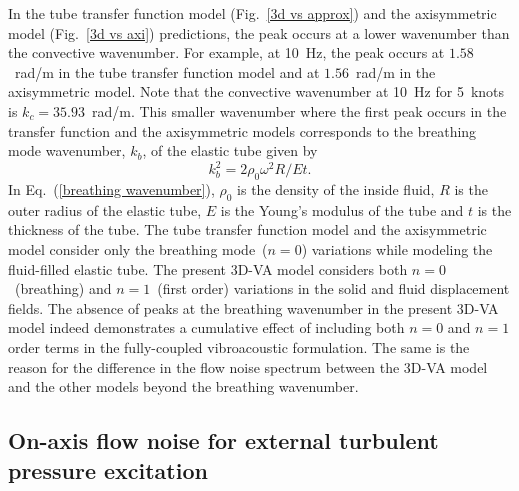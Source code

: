 \documentclass[11pt,cleanfoot]{asme2ej}
\begin{document}
In the tube transfer function model (Fig.~\ref{3d vs approx}) and the axisymmetric model (Fig.~\ref{3d vs axi}) predictions, the peak occurs at a lower wavenumber than the convective wavenumber. For example, at 10~Hz, the peak occurs at $1.58$~rad/m in the tube transfer function model and at $1.56$~rad/m in the axisymmetric model. Note that the convective wavenumber at 10~Hz for 5~knots is $k_c = 35.93$~rad/m. This smaller wavenumber where the first peak occurs in the transfer function and the axisymmetric models corresponds to the breathing mode wavenumber, $k_b$, of the elastic tube given by~\cite{knight1996}
\begin{equation}\label{breathing wavenumber}
k_b^2 = 2\rho_0\omega^2R/Et.
\end{equation}
In Eq.~(\ref{breathing wavenumber}), $\rho_0$ is the density of the inside fluid, $R$ is the outer radius of the elastic tube, $E$ is the Young's modulus of the tube and $t$ is the thickness of the tube. The tube transfer function model and the axisymmetric model consider only the breathing mode~($n=0$) variations while modeling the fluid-filled elastic tube. The present 3D-VA model considers both $n=0$~(breathing) and $n=1$~(first order) variations in the solid and fluid displacement fields. The absence of peaks at the breathing wavenumber in the present 3D-VA model indeed demonstrates a cumulative effect of including both $n=0$ and $n=1$ order terms in the fully-coupled vibroacoustic formulation. The same is the reason for the difference in the flow noise spectrum between the 3D-VA model and the other models beyond the breathing wavenumber.



\subsection{On-axis flow noise for external turbulent pressure excitation}
\label{on-axis flow noise}
\end{document}

